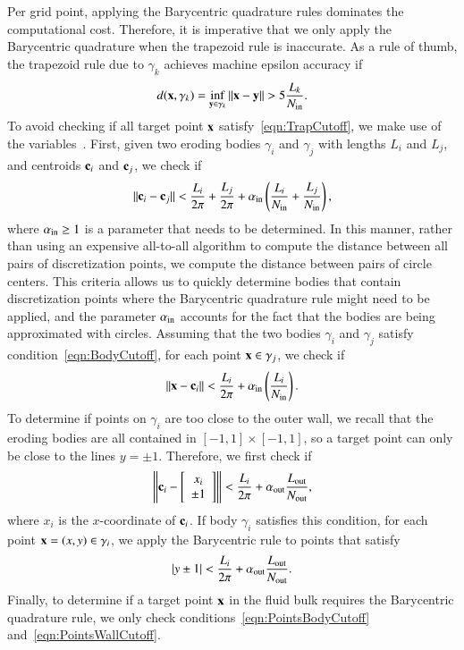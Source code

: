 \documentclass[preprint,10pt]{elsarticle}
\begin{document}
Per grid point, applying the Barycentric quadrature rules dominates the
computational cost. Therefore, it is imperative that we only apply the
Barycentric quadrature when the trapezoid rule is inaccurate.  As a rule
of thumb, the trapezoid rule due to $\gamma_k$ achieves machine epsilon
accuracy if~\cite{bar2014}
\begin{align}
  \label{eqn:TrapCutoff}
  d({\mathbf{x}},\gamma_k) = \inf_{{\mathbf{y}} \in \gamma_k} \|{\mathbf{x}} - {\mathbf{y}}\| > 
    5 \frac{L_k}{N_{\mathrm{in}}}.
\end{align}
To avoid checking if all target point ${\mathbf{x}}$
satisfy~\eqref{eqn:TrapCutoff}, we make use of the {\thL}
variables~\cite{hou-low-she1994}.  First, given two eroding bodies
$\gamma_i$ and $\gamma_j$ with lengths $L_i$ and $L_j$, and centroids
${\mathbf{c}}_i$ and ${\mathbf{c}}_j$, we check if
\begin{align}
  \label{eqn:BodyCutoff}
  \|{\mathbf{c}}_i - {\mathbf{c}}_j\| < \frac{L_i}{2\pi} + \frac{L_j}{2\pi} + 
    \alpha_{\mathrm{in}} \left(\frac{L_i}{N_{\mathrm{in}}} + \frac{L_j}{N_{\mathrm{in}}} \right),
\end{align}
where $\alpha_{\mathrm{in}} \geq 1$ is a parameter that needs to be determined.
In this manner, rather than using an expensive all-to-all algorithm to
compute the distance between all pairs of discretization points, we
compute the distance between pairs of circle centers.  This criteria
allows us to quickly determine bodies that contain discretization points
where the Barycentric quadrature rule might need to be applied, and the
parameter $\alpha_{\mathrm{in}}$ accounts for the fact that the bodies are being
approximated with circles.  Assuming that the two bodies $\gamma_i$ and
$\gamma_j$ satisfy condition~\eqref{eqn:BodyCutoff}, for each point ${\mathbf{x}}
\in \gamma_j$, we check if
\begin{align}
  \label{eqn:PointsBodyCutoff}
  \|{\mathbf{x}} - {\mathbf{c}}_i\| < \frac{L_i}{2\pi}
+ \alpha_{\mathrm{in}} \left(\frac{L_i}{N_{\mathrm{in}}} \right).
\end{align}
To determine if points on $\gamma_i$ are too close to the outer wall, we
recall that the eroding bodies are all contained in $[-1,1] \times
[-1,1]$, so a target point can only be close to the lines $y = \pm 1$.
Therefore, we first check if
\begin{align}
  \left\|{\mathbf{c}}_i - \left[
    \begin{array}{c}
      x_i \\ \pm 1
    \end{array}
    \right]
  \right\| < \frac{L_i}{2 \pi} + \alpha_{\mathrm{out}} \frac{L_{\mathrm{out}}}{N_{\mathrm{out}}},
\end{align}
where $x_i$ is the $x$-coordinate of ${\mathbf{c}}_i$. If body $\gamma_i$
satisfies this condition, for each point ${\mathbf{x}}=(x,y) \in \gamma_i$, we
apply the Barycentric rule to points that satisfy
\begin{align}
  \label{eqn:PointsWallCutoff}
  |y \pm 1| < \frac{L_i}{2 \pi} +\alpha_{\mathrm{out}} \frac{L_{\mathrm{out}}}{N_{\mathrm{out}}}.
\end{align}
Finally, to determine if a target point ${\mathbf{x}}$ in the fluid bulk requires
the Barycentric quadrature rule, we only check
conditions~\eqref{eqn:PointsBodyCutoff}
and~\eqref{eqn:PointsWallCutoff}.  
\end{document}

